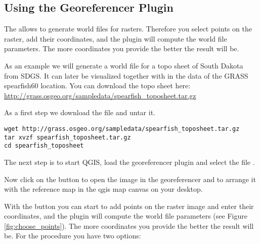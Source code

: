 \subsection{Using the Georeferencer Plugin}

\updatedisclaimer

The  allows to generate world files for rasters.
Therefore you select points on the raster, add their coordinates, and the plugin will compute the world file parameters.
The more coordinates you provide the better the result will be.

As an example we will generate a world file for a topo sheet of South Dakota from SDGS.
It can later be visualized together with in the data of the GRASS spearfish60 location.
You can download the topo sheet here: \url{http://grass.osgeo.org/sampledata/spearfish\_toposheet.tar.gz}

As a first step we download the file and untar it.

\begin{verbatim}
wget http://grass.osgeo.org/sampledata/spearfish_toposheet.tar.gz
tar xvzf spearfish_toposheet.tar.gz
cd spearfish_toposheet
\end{verbatim}

The next step is to start QGIS, load the georeferencer plugin and select the file .


Now click on the button  to open the image in the georeferencer and to arrange it with the reference map in the qgis map canvas on your desktop.


With the button  you can start to add points on the raster image and enter their coordinates, and the plugin will compute the world file parameters (see Figure \ref{fig:choose_points}).
The more coordinates you provide the better the result will be.
For the procedure you have two options:


